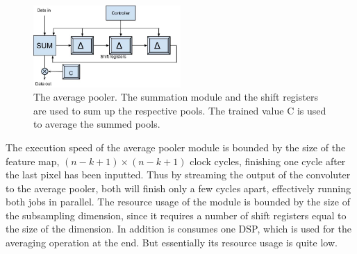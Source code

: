 \begin{figure}[h!]
  \centering
      \includegraphics[width=0.5\textwidth]{Figures/Method/submax}
  \caption{The average pooler. The summation module and the shift registers are used to sum up the respective pools. The trained value C is used to average the summed pools.}
  \label{fig_average_pooler}
\end{figure}

The execution speed of the average pooler module is bounded by the size of the feature map, $ (n-k+1) \times (n-k+1) $ clock cycles, finishing one cycle after the last pixel has been inputted. Thus by streaming the output of the convoluter to the average pooler, both will finish only a few cycles apart, effectively running both jobs in parallel. The resource usage of the module is bounded by the size of the subsampling dimension, since it requires a number of shift registers equal to the size of the dimension. In addition is consumes one DSP, which is used for the averaging operation at the end. But essentially its resource usage is quite low.  

